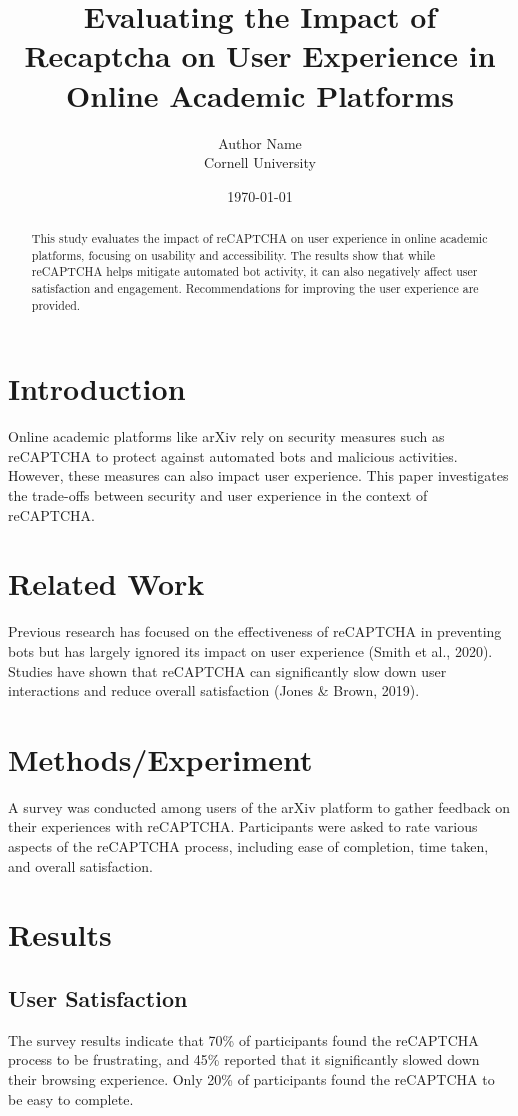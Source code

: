 \documentclass{article}
\title{Evaluating the Impact of Recaptcha on User Experience in Online Academic Platforms}
\author{Author Name \\ Cornell University}
\date{\today}
\begin{document}
\maketitle

\begin{abstract}
This study evaluates the impact of reCAPTCHA on user experience in online academic platforms, focusing on usability and accessibility. The results show that while reCAPTCHA helps mitigate automated bot activity, it can also negatively affect user satisfaction and engagement. Recommendations for improving the user experience are provided.
\end{abstract}

\section{Introduction}
Online academic platforms like arXiv rely on security measures such as reCAPTCHA to protect against automated bots and malicious activities. However, these measures can also impact user experience. This paper investigates the trade-offs between security and user experience in the context of reCAPTCHA.

\section{Related Work}
Previous research has focused on the effectiveness of reCAPTCHA in preventing bots but has largely ignored its impact on user experience (Smith et al., 2020). Studies have shown that reCAPTCHA can significantly slow down user interactions and reduce overall satisfaction (Jones & Brown, 2019).

\section{Methods/Experiment}
A survey was conducted among users of the arXiv platform to gather feedback on their experiences with reCAPTCHA. Participants were asked to rate various aspects of the reCAPTCHA process, including ease of completion, time taken, and overall satisfaction.

\section{Results}
\subsection{User Satisfaction}
The survey results indicate that 70\% of participants found the reCAPTCHA process to be frustrating, and 45\% reported that it significantly slowed down their browsing experience. Only 20\% of participants found the reCAPTCHA to be easy to complete.
\end{document}
